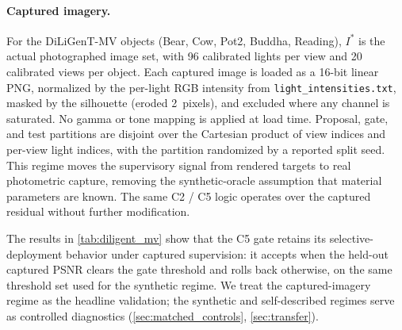 \paragraph*{Captured imagery.}
For the DiLiGenT-MV objects (Bear, Cow, Pot2, Buddha, Reading), \(I^*\)
is the actual photographed image set, with 96 calibrated lights per view
and 20 calibrated views per object. Each captured image is loaded as a
16-bit linear PNG, normalized by the per-light RGB intensity from
\texttt{light\_intensities.txt}, masked by the silhouette (eroded
2~pixels), and excluded where any channel is saturated. No gamma or tone
mapping is applied at load time. Proposal, gate, and test partitions
are disjoint over the Cartesian product of view indices and per-view
light indices, with the partition randomized by a reported split seed.
This regime moves the supervisory signal from rendered targets to real
photometric capture, removing the synthetic-oracle assumption that
material parameters are known. The same C2 / C5 logic operates over
the captured residual without further modification.

The results in \cref{tab:diligent_mv} show that the C5 gate retains its
selective-deployment behavior under captured supervision: it accepts
when the held-out captured PSNR clears the gate threshold and rolls back
otherwise, on the same threshold set used for the synthetic regime. We
treat the captured-imagery regime as the headline validation; the
synthetic and self-described regimes serve as controlled diagnostics
(\cref{sec:matched_controls}, \cref{sec:transfer}).
